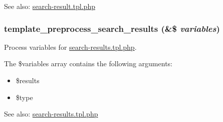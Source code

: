 \begin{Desc}
\item[See also:]\hyperlink{search-result_8tpl_8php}{search-result.tpl.php} \end{Desc}
\hypertarget{search_8pages_8inc_a0012b762375491296b1248124a177e9}{
\subsubsection[{template\_\-preprocess\_\-search\_\-results}]{\setlength{\rightskip}{0pt plus 5cm}template\_\-preprocess\_\-search\_\-results (\&\$ {\em variables})}}
\label{search_8pages_8inc_a0012b762375491296b1248124a177e9}


Process variables for \hyperlink{search-results_8tpl_8php}{search-results.tpl.php}.

The \$variables array contains the following arguments:\begin{itemize}
\item \$results\item \$type\end{itemize}


\begin{Desc}
\item[See also:]\hyperlink{search-results_8tpl_8php}{search-results.tpl.php} \end{Desc}
